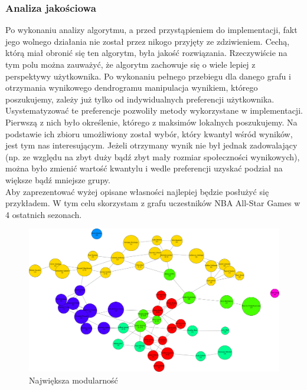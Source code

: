 \documentclass{article}
\begin{document}
\subsubsection{Analiza jakościowa}
Po wykonaniu analizy algorytmu, a przed przystąpieniem do implementacji, fakt jego wolnego działania nie został przez nikogo przyjęty ze zdziwieniem. Cechą, którą miał obronić się ten algorytm, była jakość rozwiązania. Rzeczywiście na tym polu można zauważyć, że algorytm zachowuje się o wiele lepiej z perspektywy użytkownika. Po wykonaniu pełnego przebiegu dla danego grafu i otrzymania wynikowego dendrogramu manipulacja wynikiem, którego poszukujemy, zależy już tylko od indywidualnych preferencji użytkownika.\\
Usystematyzować te preferencje pozwoliły metody wykorzystane w implementacji. Pierwszą z nich było określenie, którego z maksimów lokalnych poszukujemy. Na podstawie ich zbioru umożliwiony został wybór, który kwantyl wśród wyników, jest tym nas interesującym. Jeżeli otrzymany wynik nie był jednak zadowalający (np. ze względu na zbyt duży bądź zbyt mały rozmiar społeczności wynikowych), można było zmienić wartość kwantylu i wedle preferencji uzyskać podział na większe bądź mniejsze grupy.\\
Aby zaprezentować wyżej opisane własności najlepiej będzie posłużyć się przykładem. W tym celu skorzystam z grafu uczestników NBA All-Star Games w 4 ostatnich sezonach.

\begin{figure}[H]
\centering
\includegraphics[width=\textwidth]{images/is-sample-1.png}
\caption{Największa modularność}
\end{figure}
\end{document}
